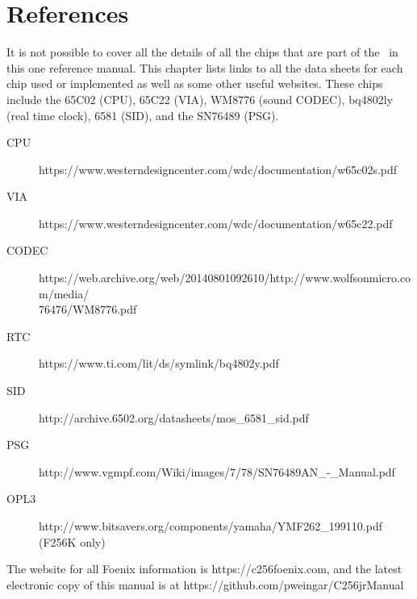 \chapter{References}

It is not possible to cover all the details of all the chips that are part of the \jr\ in this one reference manual. This chapter lists links to all the data sheets for each chip used or implemented as well as some other useful websites. These chips include the 65C02 (CPU), 65C22 (VIA), WM8776 (sound CODEC), bq4802ly (real time clock), 6581 (SID), and the SN76489 (PSG).

\begin{description}
    \item[CPU] https://www.westerndesigncenter.com/wdc/documentation/w65c02s.pdf
    \item[VIA] https://www.westerndesigncenter.com/wdc/documentation/w65c22.pdf
    \item[CODEC] https://web.archive.org/web/20140801092610/http://www.wolfsonmicro.com/media/\\76476/WM8776.pdf
    \item[RTC] https://www.ti.com/lit/ds/symlink/bq4802y.pdf
    \item[SID] http://archive.6502.org/datasheets/mos\_6581\_sid.pdf
    \item[PSG] http://www.vgmpf.com/Wiki/images/7/78/SN76489AN\_-\_Manual.pdf
    \item[OPL3] http://www.bitsavers.org/components/yamaha/YMF262\_199110.pdf (F256K only) 
\end{description}

The website for all Foenix information is https://c256foenix.com, and the latest electronic copy of this manual is at https://github.com/pweingar/C256jrManual
